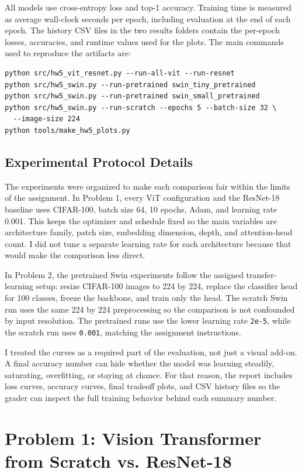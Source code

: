 \documentclass[11pt]{article}
\begin{document}
All models use cross-entropy loss and top-1 accuracy. Training time is measured as average wall-clock seconds per epoch, including evaluation at the end of each epoch. The history CSV files in the two results folders contain the per-epoch losses, accuracies, and runtime values used for the plots. The main commands used to reproduce the artifacts are:

\begin{verbatim}
python src/hw5_vit_resnet.py --run-all-vit --run-resnet
python src/hw5_swin.py --run-pretrained swin_tiny_pretrained
python src/hw5_swin.py --run-pretrained swin_small_pretrained
python src/hw5_swin.py --run-scratch --epochs 5 --batch-size 32 \
  --image-size 224
python tools/make_hw5_plots.py
\end{verbatim}

\subsection*{Experimental Protocol Details}
The experiments were organized to make each comparison fair within the limits of the assignment. In Problem 1, every ViT configuration and the ResNet-18 baseline uses CIFAR-100, batch size 64, 10 epochs, Adam, and learning rate 0.001. This keeps the optimizer and schedule fixed so the main variables are architecture family, patch size, embedding dimension, depth, and attention-head count. I did not tune a separate learning rate for each architecture because that would make the comparison less direct.

In Problem 2, the pretrained Swin experiments follow the assigned transfer-learning setup: resize CIFAR-100 images to 224 by 224, replace the classifier head for 100 classes, freeze the backbone, and train only the head. The scratch Swin run uses the same 224 by 224 preprocessing so the comparison is not confounded by input resolution. The pretrained runs use the lower learning rate \texttt{2e-5}, while the scratch run uses \texttt{0.001}, matching the assignment instructions.

I treated the curves as a required part of the evaluation, not just a visual add-on. A final accuracy number can hide whether the model was learning steadily, saturating, overfitting, or staying at chance. For that reason, the report includes loss curves, accuracy curves, final tradeoff plots, and CSV history files so the grader can inspect the full training behavior behind each summary number.

\section*{Problem 1: Vision Transformer from Scratch vs. ResNet-18}
\end{document}

